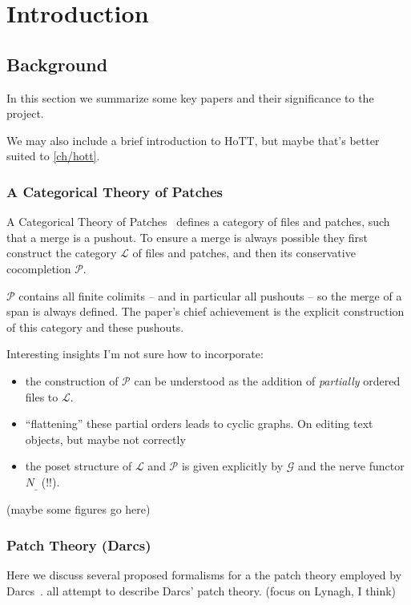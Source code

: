 \chapter{Introduction}

\section{Background}
In this section we summarize some key papers and their significance to the
project.

We may also include a brief introduction to HoTT, but maybe that's better suited
to \ref{ch/hott}.

\subsection{A Categorical Theory of Patches}
A Categorical Theory of Patches~\cite{Categorical2013} defines a category of
files and patches, such that a merge is a pushout. To ensure a merge is always
possible they first construct the category $\mathcal{L}$ of files and patches,
and then its conservative cocompletion $\mathcal{P}$.

$\mathcal{P}$ contains all finite colimits -- and in particular all pushouts --
so the merge of a span is always defined. The paper's chief achievement is the
explicit construction of this category and these pushouts.

Interesting insights I'm not sure how to incorporate:
\begin{itemize}
\item the construction of $\mathcal{P}$ can be understood as the addition of \emph{partially} ordered
  files to $\mathcal{L}$.
\item ``flattening'' these partial orders leads to cyclic graphs. On editing
  text~\cite{editing2014} objects, but maybe not correctly
\item the poset structure of $\mathcal{L}$ and $\mathcal{P}$ is given explicitly
  by $\mathcal{G}$ and the nerve functor $N_{\_}$ (!!).
\end{itemize}

(maybe some figures go here)

\subsection{Patch Theory (Darcs)}
Here we discuss several proposed formalisms for a the patch theory employed by
Darcs~\cite{Darcs}. \cite{Lynagh2006, Sittampalam2005, Dagit2009} all attempt to
describe Darcs' patch theory. (focus on Lynagh, I think)

